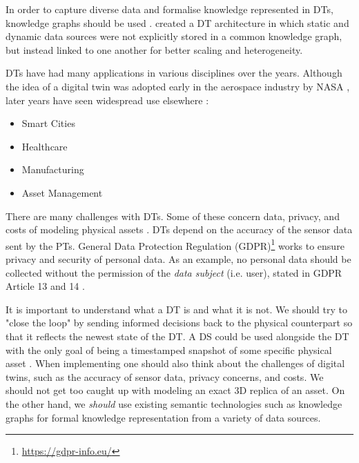 \documentclass{article}
\begin{document}
In order to capture diverse data and formalise knowledge represented in DTs, knowledge graphs should be used \cite{kamburjan_programming_2021, waszak_let_2022}. \citeauthor{waszak_let_2022} created a DT architecture in which static and dynamic data sources were not explicitly stored in a common knowledge graph, but instead linked to one another for better scaling and heterogeneity.

DTs have had many applications in various disciplines over the years. Although the idea of a digital twin was adopted early in the aerospace industry by NASA \cite{li_digital_2022}, later years have seen widespread use elsewhere \cite{fuller_digital_2020, waszak_let_2022, macchi_exploring_2018}:

\begin{itemize}
    \item Smart Cities
    \item Healthcare
    \item Manufacturing
    \item Asset Management
\end{itemize}


There are many challenges with DTs. Some of these concern data, privacy, and costs of modeling physical assets \cite{fuller_digital_2020, waszak_let_2022}. DTs depend on the accuracy of the sensor data sent by the PTs. General Data Protection Regulation (GDPR)\footnote{\url{https://gdpr-info.eu/}} works to ensure privacy and security of personal data. As an example, no personal data should be collected without the permission of the \emph{data subject} (i.e. user), stated in GDPR Article 13 and 14 \cite{noauthor_guide_nodate}.


It is important to understand what a DT is and what it is not. We should try to "close the loop" by sending informed decisions back to the physical counterpart so that it reflects the newest state of the DT. A DS could be used alongside the DT with the only goal of being a timestamped snapshot of some specific physical asset \cite{bergs_concept_2021}. When implementing one should also think about the challenges of digital twins, such as the accuracy of sensor data, privacy concerns, and costs. We should not get too caught up with modeling an exact 3D replica of an asset. On the other hand, we \emph{should} use existing semantic technologies such as knowledge graphs for formal knowledge representation from a variety of data sources.
\end{document}
